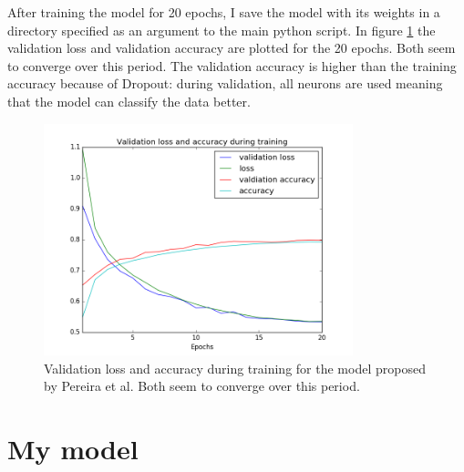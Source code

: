 \documentclass[12pt,a4paper,twoside,openright]{report}
\begin{document}
After training the model for 20 epochs, I save the model with its weights in a directory specified as an argument to the main python script. In figure \ref{fig:pereira_validation_loss} the validation loss and validation accuracy are plotted for the 20 epochs. Both seem to converge over this period. The validation accuracy is higher than the training accuracy because of Dropout: during validation, all neurons are used meaning that the model can classify the data better.
\begin{figure}
	\centering
	\includegraphics[width=0.8\textwidth]{pereira_validation_loss}
	\caption[Validation loss and accuracy during training for the model proposed by Pereira et al.]{Validation loss and accuracy during training for the model proposed by Pereira et al. Both seem to converge over this period.}
	\label{fig:pereira_validation_loss}
\end{figure}

\section{My model}
\end{document}
